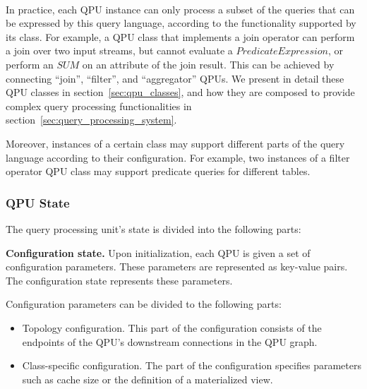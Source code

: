 ~ \bigskip

\noindent
In practice, each QPU instance can only process a subset of the queries that can be expressed by this query language,
according to the functionality supported by its class.
For example, a QPU class that implements a join operator can perform a join over two input streams,
but cannot evaluate a $PredicateExpression$, or perform an $SUM$ on an attribute of the join result.
This can be achieved by connecting ``join'', ``filter'', and ``aggregator'' QPUs.
We present in detail these QPU classes in section~\ref{sec:qpu_classes},
and how they are composed to provide complex query processing functionalities in section~\ref{sec:query_processing_system}.

Moreover, instances of a certain class may support different parts of the query language according to their
configuration.
For example, two instances of a filter operator QPU class may support predicate queries for different tables.

\subsubsection{QPU State}

The query processing unit's state is divided into the following parts:

\medskip
\noindent
\textbf{Configuration state.}
Upon initialization, each QPU is given a set of configuration parameters.
These parameters are represented as key-value pairs.
The configuration state represents these parameters.

Configuration parameters can be divided to the following parts:
\begin{itemize}
  \item Topology configuration.
  This part of the configuration consists of the endpoints of the QPU's downstream connections in the QPU graph.

  \item Class-specific configuration.
  The part of the configuration specifies parameters such as cache size or the definition of a materialized view.
\end{itemize}


